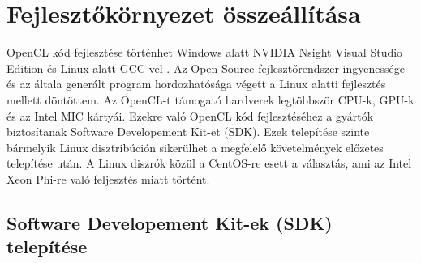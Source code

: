 \section{Fejlesztőkörnyezet összeállítása}

	OpenCL kód fejlesztése történhet Windows alatt NVIDIA Nsight Visual Studio
	Edition \cite{nsight} és Linux alatt GCC-vel \cite{gcc}.
	Az Open Source fejlesztőrendszer ingyenessége és az általa generált program hordozhatósága végett
	a Linux alatti fejlesztés mellett döntöttem. 
	Az OpenCL-t támogató hardverek legtöbbször CPU-k, GPU-k és az Intel MIC \cite{mic} kártyái.
	Ezekre való OpenCL kód fejlesztéséhez a gyártók biztosítanak Software Developement Kit-et (SDK).
	Ezek telepítése szinte bármelyik Linux disztribúción sikerülhet a megfelelő követelmények előzetes telepítése után.
	A Linux diszrók közül a CentOS-re \cite{centos} esett a választás, ami az Intel Xeon Phi-re való feljesztés miatt történt.

\subsection*{Software Developement Kit-ek (SDK) telepítése} \label{sect:sdk}
